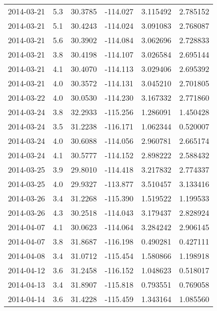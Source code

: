 \begin{tabular}{lrrrrr}
2014-03-21 &       5.3 &  30.3785 &  -114.027 &         3.115492 &         2.785152 \\
2014-03-21 &       5.1 &  30.4243 &  -114.024 &         3.091083 &         2.768087 \\
2014-03-21 &       5.6 &  30.3902 &  -114.084 &         3.062696 &         2.728833 \\
2014-03-21 &       3.8 &  30.4198 &  -114.107 &         3.026584 &         2.695144 \\
2014-03-21 &       4.1 &  30.4070 &  -114.113 &         3.029406 &         2.695392 \\
2014-03-21 &       4.0 &  30.3572 &  -114.131 &         3.045210 &         2.701805 \\
2014-03-22 &       4.0 &  30.0530 &  -114.230 &         3.167332 &         2.771860 \\
2014-03-24 &       3.8 &  32.2933 &  -115.256 &         1.286091 &         1.450428 \\
2014-03-24 &       3.5 &  31.2238 &  -116.171 &         1.062344 &         0.520007 \\
2014-03-24 &       4.0 &  30.6088 &  -114.056 &         2.960781 &         2.665174 \\
2014-03-24 &       4.1 &  30.5777 &  -114.152 &         2.898222 &         2.588432 \\
2014-03-25 &       3.9 &  29.8010 &  -114.418 &         3.217832 &         2.774337 \\
2014-03-25 &       4.0 &  29.9327 &  -113.877 &         3.510457 &         3.133416 \\
2014-03-26 &       3.4 &  31.2268 &  -115.390 &         1.519522 &         1.199533 \\
2014-03-26 &       4.3 &  30.2518 &  -114.043 &         3.179437 &         2.828924 \\
2014-04-07 &       4.1 &  30.0623 &  -114.064 &         3.284242 &         2.906145 \\
2014-04-07 &       3.8 &  31.8687 &  -116.198 &         0.490281 &         0.427111 \\
2014-04-08 &       3.4 &  31.0712 &  -115.454 &         1.580866 &         1.198918 \\
2014-04-12 &       3.6 &  31.2458 &  -116.152 &         1.048623 &         0.518017 \\
2014-04-13 &       3.4 &  31.8907 &  -115.818 &         0.793551 &         0.769058 \\
2014-04-14 &       3.6 &  31.4228 &  -115.459 &         1.343164 &         1.085560 \\

\end{tabular}
